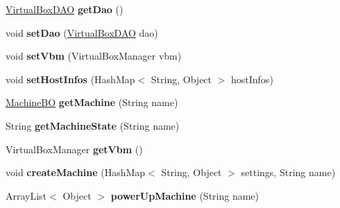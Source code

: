 \begin{DoxyCompactItemize}
\hyperlink{classrwb_1_1java_1_1vb_1_1dao_1_1_virtual_box_d_a_o}{Virtual\+Box\+D\+AO} {\bfseries get\+Dao} ()
\item 
\mbox{\label{classrwb_1_1java_1_1vb_1_1bo_1_1_virtual_box_b_o_ad333f507585c129b2184985e58e9b9d8}} 
void {\bfseries set\+Dao} (\hyperlink{classrwb_1_1java_1_1vb_1_1dao_1_1_virtual_box_d_a_o}{Virtual\+Box\+D\+AO} dao)
\item 
\mbox{\label{classrwb_1_1java_1_1vb_1_1bo_1_1_virtual_box_b_o_a8a6b0ae1bf77c8c8b56725ae0bdab367}} 
void {\bfseries set\+Vbm} (Virtual\+Box\+Manager vbm)
\item 
\mbox{\label{classrwb_1_1java_1_1vb_1_1bo_1_1_virtual_box_b_o_aa90aa5d9d81cd27e5d60757e8e0a0024}} 
void {\bfseries set\+Host\+Infos} (Hash\+Map$<$ String, Object $>$ host\+Infos)
\item 
\mbox{\label{classrwb_1_1java_1_1vb_1_1bo_1_1_virtual_box_b_o_aef17541179e18ab0b308863ed060fcf9}} 
\hyperlink{classrwb_1_1java_1_1vb_1_1bo_1_1_machine_b_o}{Machine\+BO} {\bfseries get\+Machine} (String name)
\item 
\mbox{\label{classrwb_1_1java_1_1vb_1_1bo_1_1_virtual_box_b_o_a4cf92b36c53241d8acbb22319f535f41}} 
String {\bfseries get\+Machine\+State} (String name)
\item 
\mbox{\label{classrwb_1_1java_1_1vb_1_1bo_1_1_virtual_box_b_o_ac39a82db6cf4eaf536cb80642ab876b7}} 
Virtual\+Box\+Manager {\bfseries get\+Vbm} ()
\item 
\mbox{\label{classrwb_1_1java_1_1vb_1_1bo_1_1_virtual_box_b_o_af93216cd656f41da9de492cb6a67e30b}} 
void {\bfseries create\+Machine} (Hash\+Map$<$ String, Object $>$ settings, String name)
\item 
\mbox{\label{classrwb_1_1java_1_1vb_1_1bo_1_1_virtual_box_b_o_aee461e4f7e3d6095723b3d43c911bc23}} 
Array\+List$<$ Object $>$ {\bfseries power\+Up\+Machine} (String name)

\end{DoxyCompactItemize}

